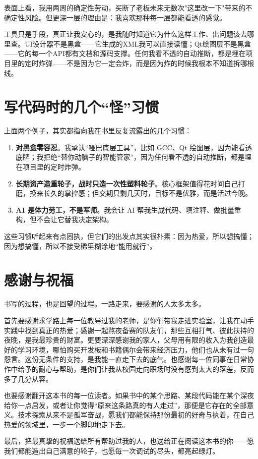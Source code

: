 表面上看，我用两周的确定性劳动，买断了老板未来无数次"这里改一下"带来的不确定性风险。但更深一层的理由是：我喜欢那种每一层都能看透的感觉。

工具只是手段，真正让我安心的，是我随时知道它为什么这样工作、出问题该去哪里查。UI设计器不是黑盒——它生成的XML我可以直接读懂；Qt绘图层不是黑盒——它的每一个API都有文档和源码支撑。任何我看不透的自动推断，都是埋在项目里的定时炸弹——不是因为它一定会炸，而是因为炸的时候我根本不知道拆哪根线。

\section{写代码时的几个“怪”习惯}

上面两个例子，其实都指向我在书里反复流露出的几个习惯：

\begin{enumerate}
\item \textbf{对黑盒零容忍}。我承认“哑巴底层工具”，比如 GCC、Qt 绘图层，因为能看透底牌；我拒绝“替你动脑子的智能管家”，因为任何看不透的自动推断，都是埋在项目里的定时炸弹。
\item \textbf{长期资产造重轮子，战时只造一次性塑料轮子}。核心框架值得花时间自己打磨，换来长久的掌控感；但交期只剩几天时，目标不是优雅，而是活过今晚。
\item \textbf{AI 是体力劳工，不是军师}。我会让 AI 帮我生成代码、填注释、做批量重构，但不会让它替我决定架构。
\end{enumerate}

这些习惯听起来有点固执，但它们的出发点其实很朴素：因为热爱，所以想搞懂；因为想搞懂，所以不接受稀里糊涂地“能用就行”。

\section{感谢与祝福}

书写的过程，也是回望的过程。一路走来，要感谢的人太多太多。

首先要感谢求学路上每一位教导过我的老师，是你们带我走进实验室，让我在动手实践中找到真正的热爱；感谢一起熬夜备赛的队友们，那些互相打气、彼此扶持的夜晚，是我最珍贵的财富。更要深深感谢我的家人，父母用有限的收入为我创造最好的学习环境，哪怕购买开发板和书籍偶尔会带来经济压力，他们也从未有过一句怨言。这份无条件的支持，是我能一直走下去的底气。也感谢每一位同事在日常协作中给予的耐心与帮助，是你们让我从校园走向职场时没有感到太大的落差，反而多了几分从容。

也要感谢翻开这本书的每一位读者。如果书中的某个思路、某段代码能在某个深夜给你一点启发，或者让你觉得“原来这条路真的有人走过”，那便是它存在的全部意义。技术探索从来不是孤军奋战，愿我们都能保持那份最初的好奇与执着，在自己热爱的领域里，一步一个脚印地走下去。

最后，把最真挚的祝福送给所有帮助过我的人，也送给正在阅读这本书的你——愿我们都能造出自己满意的轮子，也愿每一次调试的尽头，都亮起绿灯。